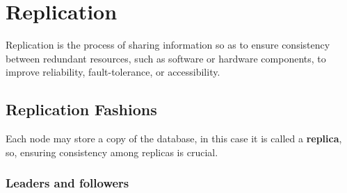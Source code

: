\chapter{Replication}

\begin{definition}
   [Replication]
   Replication is the process of sharing information so as to ensure consistency between redundant resources, such as software or hardware components, to improve reliability, fault-tolerance, or accessibility.

\end{definition}



\section{Replication Fashions}
Each node may store a copy of the database, in this case it is called a \textbf{replica}, so, ensuring consistency among replicas is crucial.


\subsection{Leaders and followers}

